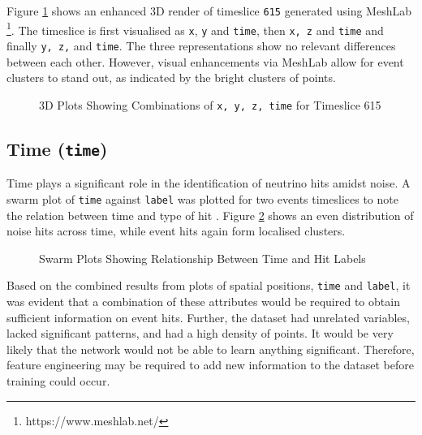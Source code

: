 Figure \ref{fig:fig:0_615} shows an enhanced 3D render of timeslice \texttt{615} generated using MeshLab \footnote{https://www.meshlab.net/}. The timeslice is first visualised as \texttt{x}, \texttt{y} and \texttt{time}, then \texttt{x, z} and  \texttt{time} and finally \texttt{y, z,} and \texttt{time}.  The three representations show no relevant differences between each other. However, visual enhancements via MeshLab allow for event clusters to stand out, as indicated by the bright clusters of points.

\begin{figure}[ht!]   
\centering
{}
\hspace{0.01cm}
\hspace{0.01cm}
\caption[]{3D Plots Showing Combinations of \texttt{x, y, z, time} for Timeslice 615}
\label{fig:fig:0_615}
\end{figure}

\subsection*{Time (\texttt{time})}
Time plays a significant role in the identification of neutrino hits amidst noise. A swarm plot of \texttt{time} against \texttt{label} was plotted for two events timeslices to note the relation between time and type of hit \cite{eklund2012beeswarm}. Figure \ref{fig:time} shows an even distribution of noise hits across time, while event hits again form localised clusters.

\begin{figure}[ht!]   
\centering
{}
\caption[]{Swarm Plots Showing Relationship Between Time and Hit Labels}
\label{fig:time}
\end{figure}

Based on the combined results from plots of spatial positions, \texttt{time} and \texttt{label}, it was evident that a combination of these attributes would be required to obtain sufficient information on event hits. Further, the dataset had unrelated variables, lacked significant patterns, and had a high density of points. It would be very likely that the network would not be able to learn anything significant. Therefore, feature engineering may be required to add new information to the dataset before training could occur. 

\let\cleardoublepage\clearpage
